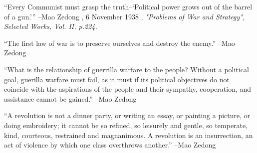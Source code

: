 \documentclass{article}%
\begin{document}
\linebreak%
\vspace{1mm}%
\begin{minipage}{\textwidth}%
\flushleft%
“Every Communist must grasp the truth–‘Political power grows out of the barrel of a gun.’”%
\linebreak%
\vspace{1mm}%
–Mao Zedong%
, 6 November 1938%
, \textit{"Problems of War and Strategy", Selected Works, Vol. II, p.224.}%
\linebreak%
\vspace{1mm}%
\end{minipage}%
\linebreak%
\vspace{1mm}%
\begin{minipage}{\textwidth}%
\flushleft%
“The first law of war is to preserve ourselves and destroy the enemy.”%
\linebreak%
\vspace{1mm}%
–Mao Zedong%
\linebreak%
\vspace{1mm}%
\end{minipage}%
\linebreak%
\vspace{1mm}%
\begin{minipage}{\textwidth}%
\flushleft%
“What is the relationship of guerrilla warfare to the people? Without a political goal, guerilla warfare must fail, as it must if its political objectives do not coincide with the aspirations of the people and their sympathy, cooperation, and assistance cannot be gained.”%
\linebreak%
\vspace{1mm}%
–Mao Zedong%
\linebreak%
\vspace{1mm}%
\end{minipage}%
\linebreak%
\vspace{1mm}%
\begin{minipage}{\textwidth}%
\flushleft%
“A revolution is not a dinner party, or writing an essay, or painting a picture, or doing embroidery; it cannot be so refined, so leisurely and gentle, so temperate, kind, courteous, restrained and magnanimous. A revolution is an insurrection, an act of violence by which one class overthrows another.”%
\linebreak%
\vspace{1mm}%
–Mao Zedong%
\linebreak%
\vspace{1mm}%
\end{minipage}%
\end{document}
